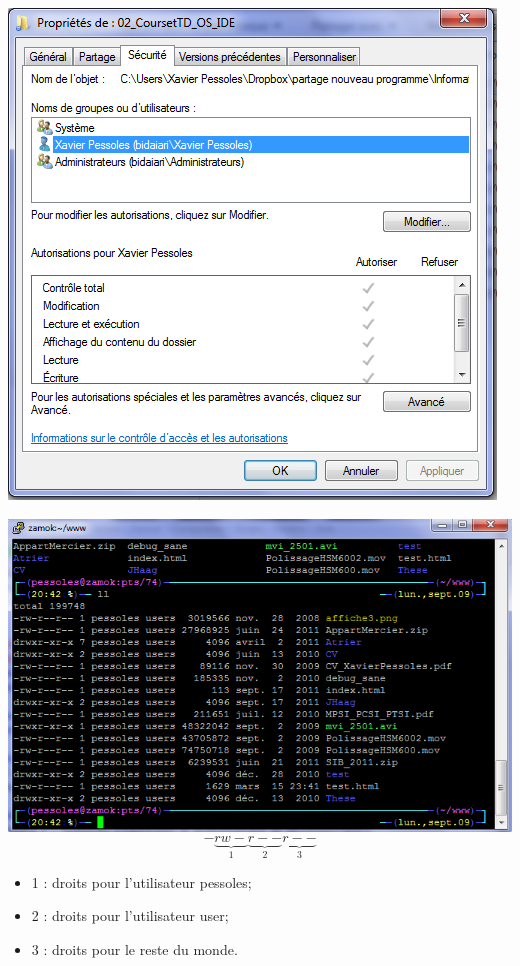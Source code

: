 \documentclass[10pt,fleqn]{article} %
\begin{document}
\begin{minipage}[c]{.45\linewidth}
\begin{center}
\includegraphics[width=.85\textwidth]{images/droits_win.png}
\end{center}
\end{minipage}\hfill
\begin{minipage}[c]{.45\linewidth}
\begin{center}
\includegraphics[width=.8\textwidth]{images/droits_lin.png}
$$
-\underbrace{rw-}_{1}\underbrace{r--}_{2}\underbrace{r--}_{3}
$$
\begin{itemize}
\item 1 : droits pour l'utilisateur pessoles;
\item 2 : droits pour l'utilisateur user;
\item 3 : droits pour le reste du monde.
\end{itemize}
\end{center}
\end{minipage}
\end{document}
